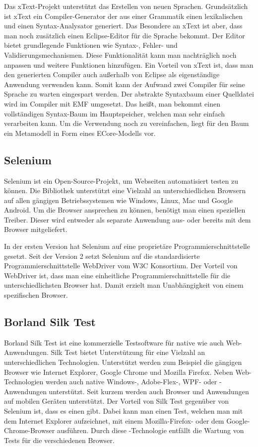 Das xText-Projekt \cite{xtext} unterstützt das Erstellen von neuen Sprachen. Grundsätzlich ist xText ein Compiler-Generator der aus einer Grammatik einen lexikalischen und einen Syntax-Analysator generiert. Das Besondere an xText ist aber, dass man noch zusätzlich einen Eclipse-Editor für die Sprache bekommt. Der Editor bietet grundlegende Funktionen wie Syntax-, Fehler- und Validierungsmechanismen. Diese Funktionalität kann man nachträglich noch anpassen und weitere Funktionen hinzufügen. Ein Vorteil von xText ist, dass man den generierten Compiler auch außerhalb von Eclipse als eigenständige Anwendung verwenden kann. Somit kann der Aufwand zwei Compiler für seine Sprache zu warten eingespart werden. Der abstrakte Syntaxbaum einer Quelldatei wird im Compiler mit EMF umgesetzt. Das heißt, man bekommt einen vollständigen Syntax-Baum im Hauptspeicher, welchen man sehr einfach verarbeiten kann. Um die Verwendung noch zu vereinfachen, liegt für den Baum ein Metamodell in Form eines ECore-Modells vor. 

\subsection{Selenium}

Selenium \cite{Selenium} ist ein Open-Source-Projekt, um Webseiten automatisiert testen zu können. Die Bibliothek unterstützt eine Vielzahl an unterschiedlichen Browsern auf allen gängigen Betriebssystemen wie Windows, Linux, Mac und Google Android. Um die Browser ansprechen zu können, benötigt man einen speziellen Treiber. Dieser wird entweder als separate Anwendung aus- oder bereits mit dem Browser mitgeliefert.

\SuperPar
In der ersten Version hat Selenium auf eine proprietäre Programmierschnittstelle gesetzt. Seit der Version 2 setzt Selenium auf die standardisierte Programmierschnittstelle WebDriver \cite{WebDriver} vom W3C Konsortium. Der Vorteil von WebDriver ist, dass man eine einheitliche Programmierschnittstelle für die unterschiedlichsten Browser hat. Damit erzielt man Unabhängigkeit von einem spezifischen Browser. 

\subsection{Borland Silk Test}

Borland Silk Test \cite{SilkTest} ist eine kommerzielle Testsoftware für native wie auch Web-Anwendungen. Silk Test bietet Unterstützung für eine Vielzahl an unterschiedlichen Technologien. Unterstützt werden zum Beispiel die gängigen Browser wie Internet Explorer, Google Chrome und Mozilla Firefox. Neben Web-Technologien werden auch native Windows-, Adobe-Flex-, WPF- oder -Anwendungen unterstützt. Seit kurzem werden auch Browser und Anwendungen  auf mobilen Geräten unterstützt. Der Vorteil von Silk Test gegenüber von Selenium ist, dass es einen  gibt. Dabei kann man einen Test, welchen man mit dem Internet Explorer aufzeichnet, mit einem Mozilla-Firefox- oder dem Google-Chrome-Browser ausführen. Durch diese -Technologie entfällt die Wartung von Tests für die verschiedenen Browser. 
